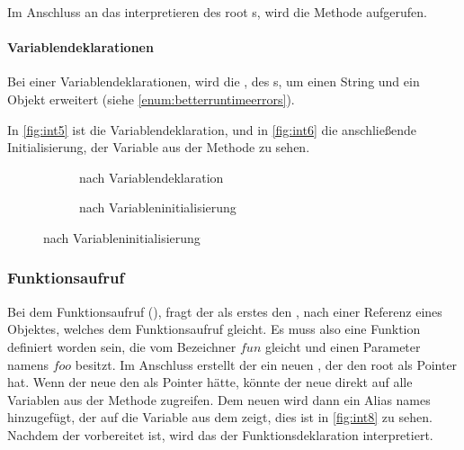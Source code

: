 {{      Im Anschluss an das interpretieren des root s, wird die  Methode aufgerufen.

      \paragraph{Variablendeklarationen}
        Bei einer Variablendeklarationen, wird die , des s, um einen String und ein  Objekt erweitert (siehe \autoref{enum:betterruntimeerrors}).

        In \autoref{fig:int5} ist die Variablendeklaration, und in \autoref{fig:int6} die anschließende Initialisierung, der Variable aus der  Methode zu sehen.
        \begin{figure}[H]
          \centering
          \begin{minipage}{.45\linewidth}
            \begin{figure}[H]
              \centering
              \caption{ nach Variablendeklaration}
              \label{fig:int5}
            \end{figure}
          \end{minipage}%
          \begin{minipage}{.45\linewidth}
            \begin{figure}[H]
              \centering
              \caption{ nach Variableninitialisierung}
              \label{fig:int6}
            \end{figure}
          \end{minipage}
        \end{figure}

    \subsubsection{Funktionsaufruf}
    \label{sssec:Funktionsaufruf}
      Bei dem Funktionsaufruf (), fragt der  als erstes den , nach einer Referenz eines  Objektes, welches dem Funktionsaufruf gleicht. Es muss also eine Funktion definiert worden sein, die vom Bezeichner \myRIn$fun$ gleicht und einen Parameter namens \myRIn$foo$ besitzt. Im Anschluss erstellt der  ein neuen , der den root  als Pointer hat. Wenn der neue  den   als Pointer hätte, könnte der neue  direkt auf alle Variablen aus der  Methode zugreifen. Dem neuen  wird dann ein Alias names  hinzugefügt, der auf die  Variable aus dem   zeigt, dies ist in \autoref{fig:int8} zu sehen. Nachdem der  vorbereitet ist, wird das  der Funktionsdeklaration interpretiert.

}}

